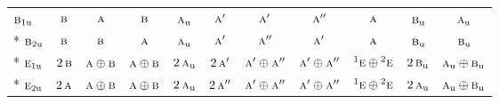 \documentclass[10pt,a4paper]{article}
\numberwithin{equation}{section}
\newcommand{\irr}[1]{\text{\normalfont\scshape #1}}
\newcommand{\conjpair}[1]{{}^{#1}}
\newcommand{\ptag}[1]{\mathrm{#1}}
\begin{document}
{\begin{longtable}{@{}lcccccccccc@{}}
$\irr{b}_{1\ptag{u}}$ & $\irr{b}$ & $\irr{a}$ & $\irr{b}$ & $\irr{a}_{\ptag{u}}$ & $\irr{a}'$ & $\irr{a}'$ & $\irr{a}''$ & $\irr{a}$ & $\irr{b}_{\ptag{u}}$ & $\irr{a}_{\ptag{u}}$\\*
$\irr{b}_{2\ptag{u}}$ & $\irr{b}$ & $\irr{b}$ & $\irr{a}$ & $\irr{a}_{\ptag{u}}$ & $\irr{a}'$ & $\irr{a}''$ & $\irr{a}'$ & $\irr{a}$ & $\irr{b}_{\ptag{u}}$ & $\irr{b}_{\ptag{u}}$\\*
$\irr{e}_{1\ptag{u}}$ & $2\,\irr{b}$ & $\irr{a}\oplus \irr{b}$ & $\irr{a}\oplus \irr{b}$ & $2\,\irr{a}_{\ptag{u}}$ & $2\,\irr{a}'$ & $\irr{a}'\oplus \irr{a}''$ & $\irr{a}'\oplus \irr{a}''$ & $\conjpair{1}\irr{e}\oplus \conjpair{2}\irr{e}$ & $2\,\irr{b}_{\ptag{u}}$ & $\irr{a}_{\ptag{u}}\oplus \irr{b}_{\ptag{u}}$\\*
$\irr{e}_{2\ptag{u}}$ & $2\,\irr{a}$ & $\irr{a}\oplus \irr{b}$ & $\irr{a}\oplus \irr{b}$ & $2\,\irr{a}_{\ptag{u}}$ & $2\,\irr{a}''$ & $\irr{a}'\oplus \irr{a}''$ & $\irr{a}'\oplus \irr{a}''$ & $\conjpair{1}\irr{e}\oplus \conjpair{2}\irr{e}$ & $2\,\irr{a}_{\ptag{u}}$ & $\irr{a}_{\ptag{u}}\oplus \irr{b}_{\ptag{u}}$\\
\bottomrule\end{longtable}}
\end{document}
